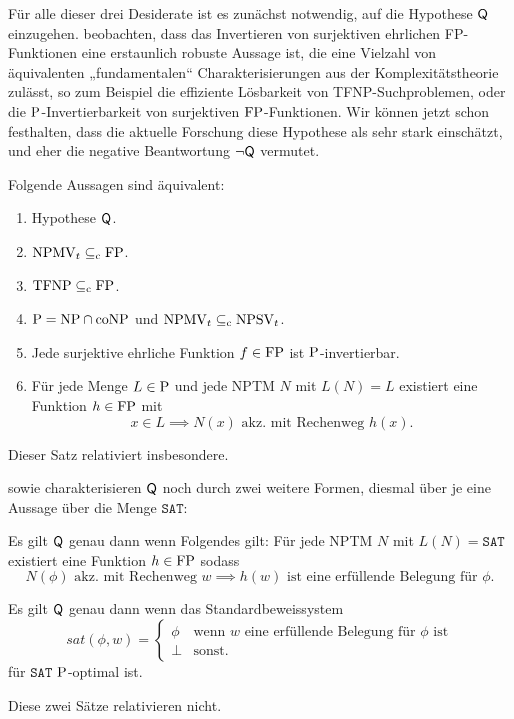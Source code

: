 Für alle dieser drei Desiderate ist es zunächst notwendig, auf die Hypothese $\hQ$ einzugehen.
\textcite{fenner_inverting_2003} beobachten, dass das Invertieren von surjektiven ehrlichen FP-Funktionen eine erstaunlich robuste Aussage ist, die eine Vielzahl von äquivalenten „fundamentalen“ \parencite*[91]{fenner_inverting_2003} Charakterisierungen aus der Komplexitätstheorie zulässt, so zum Beispiel die effiziente Lösbarkeit von TFNP-Suchproblemen, oder die $\P$-Invertierbarkeit von surjektiven $\FP$-Funktionen. Wir können jetzt schon festhalten, dass die aktuelle Forschung diese Hypothese als sehr stark einschätzt, und eher die negative Beantwortung $\neg\hQ$ vermutet.\pagebreak


\begin{theorem}\label{thm:q-orig}
    Folgende Aussagen sind äquivalent:
    \begin{enumerate}
        \item Hypothese $\hQ$.
        \item $\mathrm{NPMV}_t\subseteqc \mathrm{FP}$.
        \item $\TFNP\subseteqc \mathrm{FP}$.
        \item $\P=\NP\cap\coNP$ und $\mathrm{NPMV}_t\subseteqc \mathrm{NPSV}_t$.
        \item Jede surjektive ehrliche Funktion $f\in\FP$ ist $\P$-invertierbar.
        \item Für jede Menge $L\in \P$  und jede NPTM $N$ mit $L(N)=L$ existiert eine Funktion $h\in \FP$ mit 
            \[ x\in L \implies N(x) \text{ akz. mit Rechenweg $h(x)$}. \]
    \end{enumerate}
\end{theorem}
Dieser Satz relativiert insbesondere.

\textcite{fenner_inverting_2003} sowie \textcite{kobler_is_2000} charakterisieren $\hQ$ noch durch zwei weitere Formen, diesmal über je eine Aussage über die Menge $\mathtt{SAT}$:

\begin{theorem}\label{thm:q-fenner}
    Es gilt $\hQ$ genau dann wenn Folgendes gilt: Für jede NPTM $N$ mit $L(N)=\mathtt{SAT}$ existiert eine Funktion $h\in \FP$ sodass 
\[ N(\phi) \text{ akz. mit Rechenweg $w$} \implies \text{$h(w)$ ist eine erfüllende Belegung für $\phi$.} \]
\end{theorem}
\begin{theorem}\label{thm:q-messner}
    Es gilt $\hQ$ genau dann wenn das Standardbeweissystem
            \[ \mathit{sat}(\phi, w) = \begin{cases} \phi & \text{wenn $w$ eine erfüllende Belegung für $\phi$ ist} \\ \bot & \text{sonst.} \end{cases}\]
            für $\mathtt{SAT}$ $\P$-optimal ist.
\end{theorem}
Diese zwei Sätze relativieren nicht.

